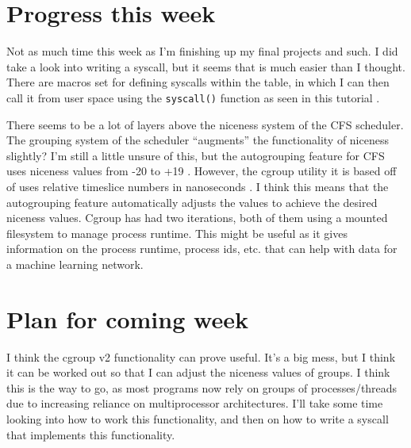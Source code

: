 \documentclass[12pt]{article}
\def\ind{\hspace*{0.3in}}
\begin{document}
\setlength{\parindent}{0in}
\addtolength{\parskip}{0.1cm}
\setlength{\fboxrule}{.5mm}\setlength{\fboxsep}{1.2mm}
\newlength{\boxlength}\setlength{\boxlength}{\textwidth}
\addtolength{\boxlength}{-4mm}
\begin{center}
\end{center}
\vspace{2mm}

\section*{Progress this week}
\ind Not as much time this week as I'm finishing up my final projects and such. I did take a look into writing a syscall, but it seems that is much easier than I thought. There are macros set for defining syscalls within the table, in which I can then call it from user space using the \texttt{syscall()} function as seen in this tutorial \cite{brennanTutorialWriteSystem}. 

There seems to be a lot of layers above the niceness system of the CFS scheduler. The grouping system of the scheduler ``augments'' the functionality of niceness slightly? I'm still a little unsure of this, but the autogrouping feature for CFS uses niceness values from -20 to +19 \cite{LinuxKernelArchiveRFC}. However, the cgroup utility it is based off of uses relative timeslice numbers in nanoseconds \cite{CgroupsLinuxManual,ControlGroupsLinux,heoControlGroupV22015}. I think this means that the autogrouping feature automatically adjusts the values to achieve the desired niceness values. Cgroup has had two iterations, both of them using a mounted filesystem to manage process runtime. This might be useful as it gives information on the process runtime, process ids, etc. that can help with data for a machine learning network.


\section*{Plan for coming week}
\ind I think the cgroup v2 functionality can prove useful. It's a big mess, but I think it can be worked out so that I can adjust the niceness values of groups. I think this is the way to go, as most programs now rely on groups of processes/threads due to increasing reliance on multiprocessor architectures. I'll take some time looking into how to work this functionality, and then on how to write a syscall that implements this functionality.
\end{document}
